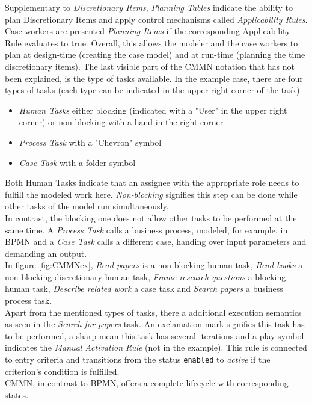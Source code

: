 Supplementary to \textit{Discretionary Items}, \textit{Planning Tables} indicate the ability to plan Discretionary Items and apply control mechanisms called \textit{Applicability Rules}. Case workers are presented \textit{Planning Items} if the corresponding Applicability Rule evaluates to true. Overall, this allows the modeler and the case workers to plan at design-time (creating the case model) and at run-time (planning the time discretionary items). \newpage
The last visible part of the CMMN notation that has not been explained, is the type of tasks available. In the example case, there are four types of tasks (each type can be indicated in the upper right corner of the task):

\begin{itemize}
\item \textit{Human Tasks} either blocking (indicated with a "User" in the upper right corner) or non-blocking with a hand in the right corner
\item \textit{Process Task} with a "Chevron" symbol 
\item \textit{Case Task} with a folder symbol 
\end{itemize}

Both Human Tasks indicate that an assignee with the appropriate role needs to fulfill the modeled work here. \textit{Non-blocking} signifies this step can be done while other tasks of the model run simultaneously. \\
In contrast, the blocking one does not allow other tasks to be performed at the same time. A \textit{Process Task} calls a business process, modeled, for example, in BPMN and a \textit{Case Task} calls a different case, handing over input parameters and demanding an output. \\
In figure \ref{fig:CMMNex}, \textit{Read papers} is a non-blocking human task, \textit{Read books} a non-blocking discretionary human task, \textit{Frame research questions} a blocking human task, \textit{Describe related work} a case task and \textit{Search papers} a business process task.\\
Apart from the mentioned types of tasks, there a additional execution semantics as seen in the \textit{Search for papers} task. An exclamation mark signifies this task has to be performed, a sharp mean this task has several iterations and a play symbol indicates the \textit{Manual Activation Rule} (not in the example). This rule is connected to entry criteria and transitions from the status \texttt{enabled} to \textit{active} if the criterion's condition is fulfilled. \\
CMMN, in contrast to BPMN, offers a complete lifecycle with corresponding states.

